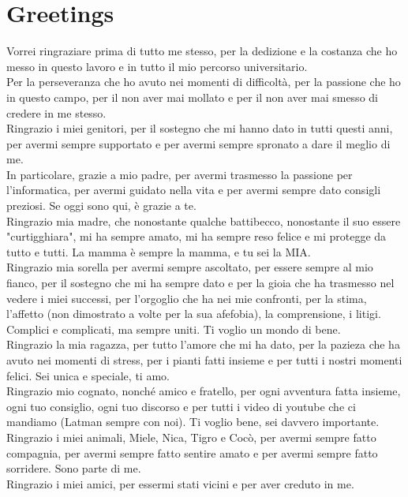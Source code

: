 \chapter*{Greetings}

Vorrei ringraziare prima di tutto me stesso, per la dedizione e la costanza che ho messo in questo lavoro e in tutto il mio percorso universitario.
\\Per la perseveranza che ho avuto nei momenti di difficoltà, per la passione che ho in questo campo, per il non aver mai mollato e per il non aver mai smesso di credere in me stesso.
\\Ringrazio i miei genitori, per il sostegno che mi hanno dato in tutti questi anni, per avermi sempre supportato e per avermi sempre spronato a dare il meglio di me.
\\In particolare, grazie a mio padre, per avermi trasmesso la passione per l'informatica, per avermi guidato nella vita e per avermi sempre dato consigli preziosi. Se oggi sono qui, è grazie a te.
\\Ringrazio mia madre, che nonostante qualche battibecco, nonostante il suo essere "curtigghiara", mi ha sempre amato, mi ha sempre reso felice e mi protegge da tutto e tutti. La mamma è sempre la mamma, e tu sei la MIA.
\\Ringrazio mia sorella per avermi sempre ascoltato, per essere sempre al mio fianco, per il sostegno che mi ha sempre dato e per la gioia che ha trasmesso nel vedere i miei successi, per l'orgoglio che ha nei mie confronti, per la stima, l'affetto (non dimostrato a volte per la sua afefobia), la comprensione, i litigi.
Complici e complicati, ma sempre uniti. Ti voglio un mondo di bene.
\\Ringrazio la mia ragazza, per tutto l'amore che mi ha dato, per la pazieza che ha avuto nei momenti di stress, per i pianti fatti insieme e per tutti i nostri momenti felici. Sei unica e speciale, ti amo.
\\Ringrazio mio cognato, nonché amico e fratello, per ogni avventura fatta insieme, ogni tuo consiglio, ogni tuo discorso e per tutti i video di youtube che ci mandiamo (Latman sempre con noi). Ti voglio bene, sei davvero importante.
\\Ringrazio i miei animali, Miele, Nica, Tigro e Cocò, per avermi sempre fatto compagnia, per avermi sempre fatto sentire amato e per avermi sempre fatto sorridere. Sono parte di me.
\\Ringrazio i miei amici, per essermi stati vicini e per aver creduto in me.
